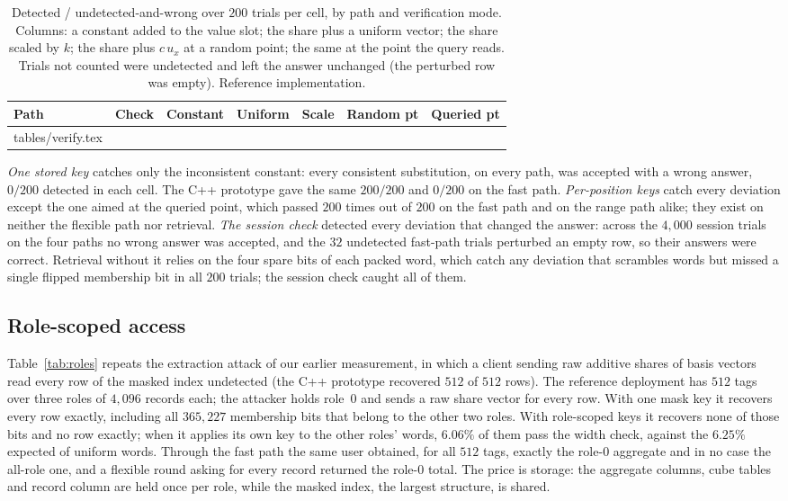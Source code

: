 \documentclass[a4paper,fleqn]{cas-sc}
\begin{document}
\begin{table}[pos=htbp]
\caption{Detected / undetected-and-wrong over $200$ trials per cell, by path
and verification mode. Columns: a constant added to the value slot; the share
plus a uniform vector; the share scaled by $k$; the share plus $c\,u_x$ at a
random point; the same at the point the query reads. Trials not counted were
undetected and left the answer unchanged (the perturbed row was empty).
Reference implementation.}
\label{tab:verify}
\centering
\footnotesize
\setlength{\tabcolsep}{3pt}
\begin{tabular*}{\tblwidth}{@{\extracolsep{\fill}}llccccc@{}}
\toprule
Path & Check & Constant & Uniform & Scale & Random pt & Queried pt \\
\midrule
{} tables/verify.tex 
\bottomrule
\end{tabular*}
\end{table}

\emph{One stored key} catches only the inconsistent constant: every consistent
substitution, on every path, was accepted with a wrong answer, $0/200$ detected
in each cell. The C++ prototype gave the same $200/200$ and $0/200$ on the fast
path. \emph{Per-position keys} catch every deviation except the one aimed at
the queried point, which passed $200$ times out of $200$ on the fast path and
on the range path alike; they exist on neither the flexible path nor
retrieval. \emph{The session check} detected every deviation that changed the
answer: across the $4{,}000$ session trials on the four paths no wrong answer
was accepted, and the $32$ undetected fast-path trials perturbed an empty row,
so their answers were correct. Retrieval without it relies on the four spare
bits of each packed word, which catch any deviation that scrambles words but
missed a single flipped membership bit in all $200$ trials; the session check
caught all of them.

\subsection{Role-scoped access}
\label{sec:authresult}
Table~\ref{tab:roles} repeats the extraction attack of our earlier
measurement, in which a client sending raw additive shares of basis vectors
read every row of the masked index undetected (the C++ prototype recovered
$512$ of $512$ rows). The reference deployment has $512$ tags over three roles
of $4{,}096$ records each; the attacker holds role~$0$ and sends a raw share
vector for every row. With one mask key it recovers every row exactly, including
all $365{,}227$ membership bits that belong to the other two roles. With
role-scoped keys it recovers none of those bits and no row exactly; when it
applies its own key to the other roles' words, $6.06\%$ of them pass the width
check, against the $6.25\%$ expected of uniform words. Through the fast path the
same user obtained, for all $512$ tags, exactly the role-$0$ aggregate and in no
case the all-role one, and a flexible round asking for every record returned
the role-$0$ total. The price is storage: the aggregate columns, cube tables and
record column are held once per role, while the masked index, the largest
structure, is shared.
\end{document}
